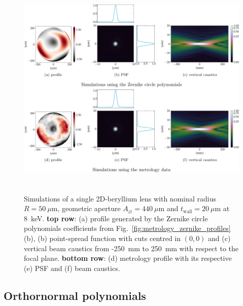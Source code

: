 \begin{refsection}
\begin{figure}[t]
        \centering
        {\includegraphics[height=10cm]{figures/ch04/metrology_zernike_simualtions.pdf}}
        \caption[Effects of other sources of deviations from the parabolic shape]{Simulations of a single 2D-beryllium lens with nominal radius $R=50~\mu\text{m}$, geometric aperture $A_{\diameter}=440~\mu\text{m}$ and $t_\text{wall}=20~\mu$m at 8~keV. \textbf{top row}: (a) profile generated by the Zernike circle polynomials coefficients from Fig.~\ref{fig:metrology_zernike_profiles}(b), (b) point-spread function with cuts centred in $(0,0)$ and (c) vertical beam caustics from -250~mm to 250~mm with respect to the focal plane. \textbf{bottom row}: (d) metrology profile with its respective (e) PSF and (f) beam caustics.} \label{fig:metrology_zernike_simualtions}
\end{figure}

\subsection{Orthornormal polynomials}\label{sec:orthonormal_polynomials}


\end{refsection}
